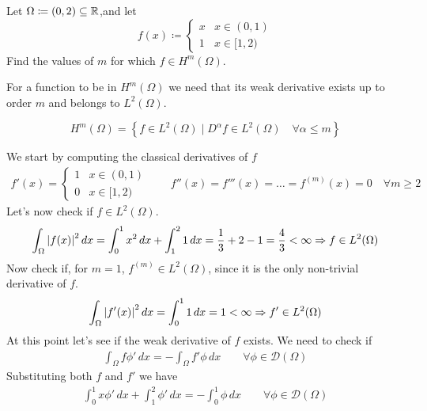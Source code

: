 \newpage
\begin{exercise}
    Let \(\Omega \coloneqq (0,2) \subseteq \mathbb{R}\),and let
    \[
        f(x) \coloneqq \begin{cases}
            x & x \in (0, 1) \\
            1 & x \in [1, 2)
        \end{cases}
    \]
    Find the values of \(m\) for which \(f \in H^m(\Omega)\).
\end{exercise}
For a function to be in \(H^m(\Omega)\) we need that its weak derivative exists up to order \(m\) and belongs to \(L^2(\Omega)\).
\begin{remark}
    \[
        H^m(\Omega) = \left\{ f \in L^2(\Omega) \mid D^\alpha f \in L^2(\Omega) \quad \forall \alpha \leq m \right\}
    \]
\end{remark}
We start by computing the classical derivatives of \(f\)
\[
    \begin{split}
        f'(x) = \begin{cases}
                    1 & x \in (0, 1) \\
                    0 & x \in [1, 2)
                \end{cases} \qquad f''(x) = f'''(x)  = \ldots = f^{(m)}(x) = 0 \quad \forall m \geq 2
    \end{split}
\]
Let's now check if \(f \in L^2(\Omega)\).
\[
    \begin{split}
        \int_\Omega \abs{f(x)}^2 \, dx = \int_0^1 x^2 \, dx + \int_1^2 1 \, dx = \frac{1}{3} + 2 - 1 = \frac{4}{3} < \infty \Rightarrow f \in L^2(\Omega)
    \end{split}
\]
Now check if, for \(m = 1\), \(f^{(m)} \in L^2(\Omega)\), since it is the only
non-trivial derivative of \(f\).
\[
    \begin{split}
        \int_\Omega \abs{f'(x)}^2 \, dx = \int_0^1 1 \, dx = 1 < \infty \Rightarrow f' \in L^2(\Omega)
    \end{split}
\]
At this point let's see if the weak derivative of \(f\) exists. We need to
check if
\[
    \begin{split}
        \int_\Omega f \phi' \, dx = - \int_\Omega f' \phi \, dx \qquad \forall \phi \in \mathcal{D}(\Omega)
    \end{split}
\]
Substituting both \(f\) and \(f'\) we have
\[
    \begin{split}
        \int_0^1 x \phi' \, dx + \int_1^2 \phi' \, dx = - \int_0^1 \phi \, dx \qquad \forall \phi \in \mathcal{D}(\Omega)
    \end{split}
\]
